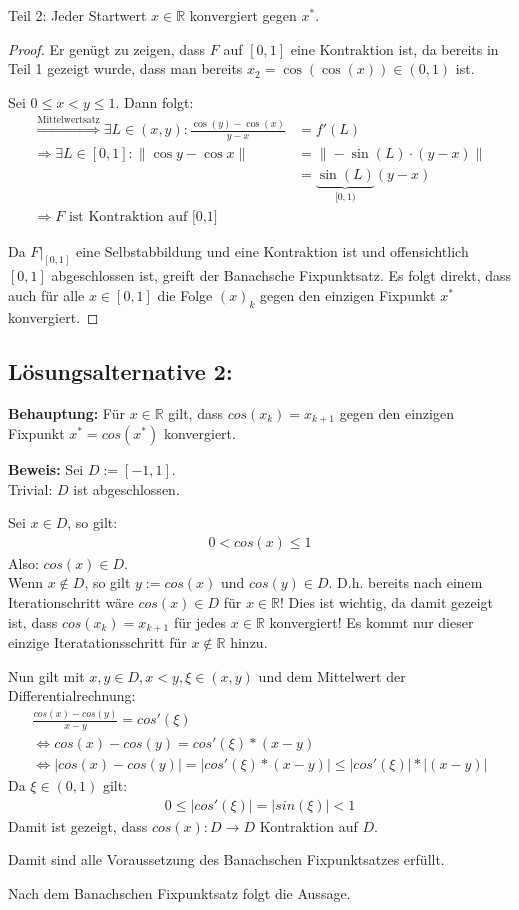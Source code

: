 Teil 2: Jeder Startwert $x \in \mathbb{R}$ konvergiert gegen $x^*$.

\begin{proof}
Er genügt zu zeigen, dass $F$ auf $[0,1]$ eine Kontraktion ist, da
bereits in Teil 1 gezeigt wurde, dass man bereits $x_2 = \cos(\cos(x)) \in (0,1)$ ist.

Sei $0 \leq x < y \leq 1$. Dann folgt:
\begin{align}
    \stackrel{\text{Mittelwertsatz}}{\Rightarrow} \exists L \in (x,y): \frac{\cos(y) - \cos(x)}{y-x} &= f'(L)\\
    \Rightarrow \exists L \in [0,1]: \| \cos y - \cos x \| &= \| - \sin(L) \cdot (y-x)\| \\
    &= \underbrace{\sin(L)}_{[0,1)} (y-x)\\
   \Rightarrow F \text{ ist Kontraktion auf [0,1]}
\end{align}

Da $F|_{[0,1]}$ eine Selbstabbildung und eine Kontraktion ist und
offensichtlich $[0,1]$ abgeschlossen ist, greift der 
Banachsche Fixpunktsatz. Es folgt direkt, dass auch für alle $x \in [0,1]$
die Folge $(x)_k$ gegen den einzigen Fixpunkt $x^*$ konvergiert.

\end{proof}

\subsection*{Lösungsalternative 2:}

\textbf{Behauptung:} Für $x \in \mathbb{R}$ gilt, dass $cos(x_k) = x_{k+1}$ gegen den einzigen Fixpunkt $x^{*} = cos(x^{*})$ konvergiert.

\textbf{Beweis:} 
Sei $ D := [-1, 1]$.\\
Trivial: $D$ ist abgeschlossen.

Sei $ x \in D$, so gilt:
\begin{align*}
	0 < cos(x) \leq 1
\end{align*}
Also: $cos(x) \in D$.\\ Wenn $x \not\in D$, so gilt $y := cos(x)$ und $cos(y) \in D$. D.h. bereits nach einem Iterationschritt wäre $cos(x) \in D$ für $x \in \mathbb{R}$! Dies ist wichtig, da damit gezeigt ist, dass $cos(x_k) = x_{k+1}$ für jedes $x \in \mathbb{R}$ konvergiert! Es kommt nur dieser einzige Iteratationsschritt für $x \not\in \mathbb{R}$ hinzu.

Nun gilt mit $ x, y \in D, x < y, \xi \in (x,y) $ und dem Mittelwert der Differentialrechnung:
\begin{align*}
	\frac{cos(x) - cos(y)}{x - y} = cos'(\xi) \\
	\Leftrightarrow cos(x) - cos(y) =  cos'(\xi) * (x - y)  \\
	\Leftrightarrow | cos(x) - cos(y) | = | cos'(\xi) * (x - y) | \leq | cos'(\xi) | * | (x - y) | 
\end{align*}
Da $ \xi \in (0, 1) $ gilt:
\begin{align*}
	0 \leq | cos'(\xi) | = | sin(\xi) | < 1 
\end{align*}
Damit ist gezeigt, dass $cos(x) : D \rightarrow D$ Kontraktion auf $D$.

Damit sind alle Voraussetzung des Banachschen Fixpunktsatzes erfüllt.

Nach dem Banachschen Fixpunktsatz folgt die Aussage.
